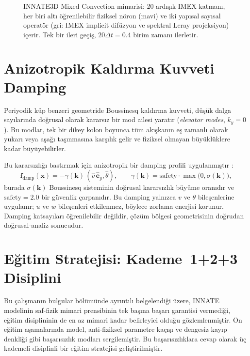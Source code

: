 \begin{figure}[H]
\caption{INNATE3D Mixed Convection mimarisi: 20 ardışık IMEX katmanı, her biri altı öğrenilebilir fiziksel nöron (mavi) ve iki yapısal sayısal operatör (gri: IMEX implicit difüzyon ve spektral Leray projeksiyon) içerir. Tek bir ileri geçiş, $20\Delta t = 0.4$ birim zamanı ilerletir.}
\label{fig:innate_mimari}
\end{figure}

\section{Anizotropik Kaldırma Kuvveti Damping}
\label{sec:anisotropic_damping}

Periyodik küp benzeri geometride Boussinesq kaldırma kuvveti, düşük dalga sayılarında doğrusal olarak kararsız bir mod ailesi yaratır (\textit{elevator modes}, $k_{y}=0$). Bu modlar, tek bir dikey kolon boyunca tüm akışkanın eş zamanlı olarak yukarı veya aşağı taşınmasına karşılık gelir ve fiziksel olmayan büyüklüklere kadar büyüyebilirler.

Bu kararsızlığı bastırmak için anizotropik bir damping profili uygulanmıştır \cite{calzavarini_damping_2014, boffetta_ecke_2012}:
\begin{equation}
\mathbf{f}_{\mathrm{damp}}(\mathbf{x}) = -\gamma(\mathbf{k})\,(\hat{v}\,\hat{\mathbf{e}}_{y}, \hat{\theta}),
\qquad
\gamma(\mathbf{k}) = \mathrm{safety}\cdot\max\!\big(0, \sigma(\mathbf{k})\big),
\label{eq:elevator_damping}
\end{equation}
burada $\sigma(\mathbf{k})$ Boussinesq sisteminin doğrusal kararsızlık büyüme oranıdır ve $\mathrm{safety}=2.0$ bir güvenlik çarpanıdır. Bu damping yalnızca $v$ ve $\theta$ bileşenlerine uygulanır; $u$ ve $w$ bileşenleri etkilenmez, böylece zorlama enerjisi korunur. Damping katsayıları öğrenilebilir değildir, çözüm bölgesi geometrisinin doğrudan doğrusal-analiz sonucudur.

\section{Eğitim Stratejisi: Kademe~1+2+3 Disiplini}
\label{sec:tier_strategy}

Bu çalışmanın bulgular bölümünde ayrıntılı belgelendiği üzere, INNATE modelinin saf-fizik mimari prensibinin tek başına başarı garantisi vermediği, eğitim disiplininin de en az mimari kadar belirleyici olduğu gözlemlenmiştir. Ön eğitim aşamalarında model, anti-fiziksel parametre kaçışı ve dengesiz kayıp denkliği gibi başarısızlık modları sergilemiştir. Bu başarısızlıklara cevap olarak üç kademeli disiplinli bir eğitim stratejisi geliştirilmiştir.

